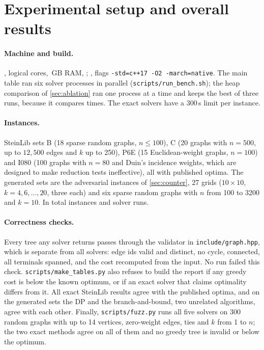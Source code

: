 \section{Experimental setup and overall results}\label{sec:experiments}

\paragraph{Machine and build.} ,  logical cores, \,GB RAM, ; ,
flags \texttt{-std=c++17 -O2 -march=native}. The main table ran six solver processes in parallel
(\texttt{scripts/run\_bench.sh}); the heap comparison of \cref{sec:ablation} ran one process at a time and keeps the best of three
runs, because it compares times. The exact solvers have a 300\,s limit per instance.

\paragraph{Instances.} SteinLib sets B (18 sparse random graphs, \(n\le100\)), C (20 graphs with \(n=500\), up to \(12{,}500\) edges and
\(k\) up to 250), P6E (15 Euclidean-weight graphs, \(n=100\)) and I080 (100 graphs with \(n=80\) and Duin's incidence weights, which
are designed to make reduction tests ineffective), all with published optima. The generated sets are the adversarial instances of \cref{sec:counter}, 27 grids
(\(10\times10\), \(k=4,6,\dots,20\), three each) and six sparse random graphs with \(n\) from 100 to 3200 and \(k=10\). In total
 instances and  solver runs.

\paragraph{Correctness checks.} Every tree any solver returns passes through the validator in \texttt{include/graph.hpp},
which is separate from all solvers: edge ids valid and distinct, no cycle, connected, all terminals spanned, and the cost recomputed from
the input. No run failed this check. \texttt{scripts/make\_tables.py} also refuses to build the report if any greedy cost is below the
known optimum, or if an exact solver that claims optimality differs from it. All  exact SteinLib results agree with the
published optima, and on the generated sets the DP and the branch-and-bound, two unrelated algorithms,
agree with each other. Finally, \texttt{scripts/fuzz.py} runs all five solvers on 300 random graphs with up to 14 vertices,
zero-weight edges, ties and \(k\) from 1 to \(n\); the two exact methods agree on all of them and no greedy tree is invalid or below
the optimum.

